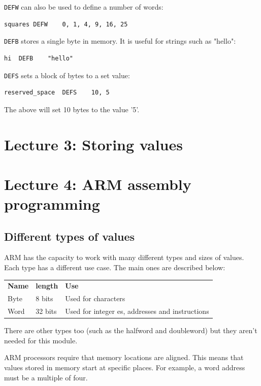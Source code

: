 \documentclass{article}
\begin{document}
{\tt DEFW} can also be used to define a number of words:

\begin{verbatim}
squares	DEFW	0, 1, 4, 9, 16, 25
\end{verbatim}

{\tt DEFB} stores a single byte in memory. It is useful for strings such as "hello":

\begin{verbatim}
hi 	DEFB	"hello"
\end{verbatim}

{\tt DEFS} sets a block of bytes to a set value:

\begin{verbatim}
reserved_space 	DEFS	10, 5
\end{verbatim}

The above will set 10 bytes to the value '5'.

\section{Lecture 3: Storing values}

\section{Lecture 4: ARM assembly programming}

\subsection{Different types of values}

ARM has the capacity to work with many different types and sizes of values. Each type has a different use case. The main ones are described below:

\begin{tabularx}{\textwidth}{l l X}
	{\bf Name} & {\bf length} & {\bf Use}\\
	Byte & 8 bits & Used for characters\\
	Word & 32 bits & Used for integer es, addresses and instructions\\
\end{tabularx}

There are other types too (such as the halfword and doubleword) but they aren't needed for this module.

ARM processors require that memory locations are aligned. This means that values stored in memory start at specific places. For example, a word address must be a multiple of four.
\end{document}
